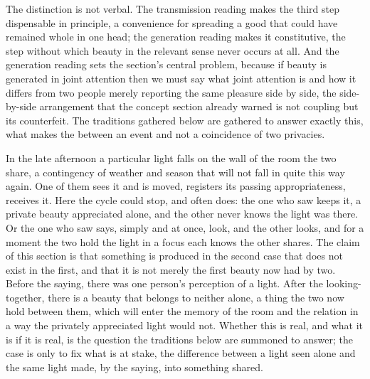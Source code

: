 
The distinction is not verbal. The transmission reading makes the third step dispensable in principle, a convenience for spreading a good that could have remained whole in one head; the generation reading makes it constitutive, the step without which beauty in the relevant sense never occurs at all. And the generation reading sets the section's central problem, because if beauty is generated in joint attention then we must say what joint attention is and how it differs from two people merely reporting the same pleasure side by side, the side-by-side arrangement that the concept section already warned is not coupling but its counterfeit. The traditions gathered below are gathered to answer exactly this, what makes the between an event and not a coincidence of two privacies.

\begin{casebox}
In the late afternoon a particular light falls on the wall of the room the two share, a contingency of weather and season that will not fall in quite this way again. One of them sees it and is moved, registers its passing appropriateness, receives it. Here the cycle could stop, and often does: the one who saw keeps it, a private beauty appreciated alone, and the other never knows the light was there. Or the one who saw says, simply and at once, look, and the other looks, and for a moment the two hold the light in a focus each knows the other shares. The claim of this section is that something is produced in the second case that does not exist in the first, and that it is not merely the first beauty now had by two. Before the saying, there was one person's perception of a light. After the looking-together, there is a beauty that belongs to neither alone, a thing the two now hold between them, which will enter the memory of the room and the relation in a way the privately appreciated light would not. Whether this is real, and what it is if it is real, is the question the traditions below are summoned to answer; the case is only to fix what is at stake, the difference between a light seen alone and the same light made, by the saying, into something shared.
\end{casebox}

